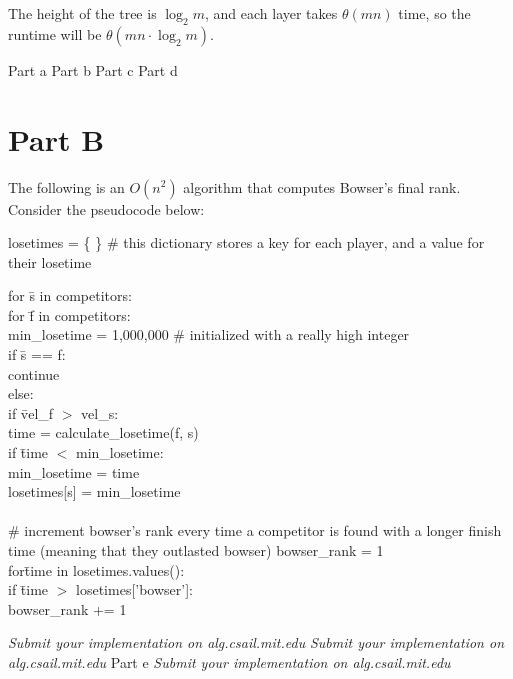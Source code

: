 \documentclass[12pt,twoside]{article}
\begin{document}
\begin{problems}
\begin{problemparts}
The height of the tree is $\log_2 m$, and each layer takes $\theta(mn)$ time, so the runtime will be $\theta(mn \cdot \log_2 m)$.



\end{problemparts}


\problem  %

\begin{problemparts}
\problempart Part a %
\problempart Part b %
\problempart Part c %
\problempart Part d %
\end{problemparts}

\section*{Part B}

\problem
\begin{problemparts}
\problempart The following is an $O(n^2)$ algorithm that computes Bowser's final rank. Consider the pseudocode below:
\bigskip

losetimes =  \{ \}  \# this dictionary stores a key for each player, and a value for their losetime

\begin{tabbing}
for \= s in competitors: \\
	\> for \= f in competitors: \\
		\>\> min\_losetime = 1,000,000 \# initialized with a really high integer \\
		\>\> if \= s == f:\\
			\>\>\> continue\\
		\>\>else:\\
			\>\>\>if \=vel\_f $>$ vel\_s:\\
				\>\>\>\>time = calculate\_losetime(f, s)\\
				\>\>\>\>if \= time $<$ min\_losetime:\\
					\>\>\>\>\>min\_losetime = time\\
	\>losetimes[s] = min\_losetime\\
	\\
	\# increment bowser's rank every time a competitor is found with a longer finish time (meaning that they outlasted bowser)
	bowser\_rank = 1\\
	for\=time in losetimes.values():\\
		\>if \=time $>$ losetimes['bowser']:\\
			\>\>bowser\_rank += 1\\

\end{tabbing}



\problempart \emph{Submit your implementation on alg.csail.mit.edu}
\problempart \emph{Submit your implementation on alg.csail.mit.edu}
\problempart Part e %
\problempart \emph{Submit your implementation on alg.csail.mit.edu}
\end{problemparts}

\end{problems}
\end{document}
